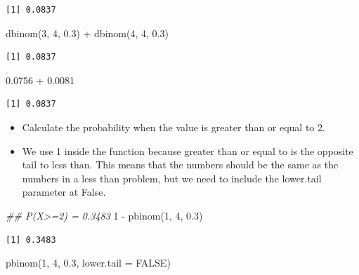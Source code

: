 \documentclass[
  letterpaper,
  DIV=11,
  numbers=noendperiod]{scrreprt}
\newenvironment{Shaded}{\begin{snugshade}}{\end{snugshade}}
\newcommand{\AttributeTok}[1]{\textcolor[rgb]{0.40,0.45,0.13}{#1}}
\newcommand{\ConstantTok}[1]{\textcolor[rgb]{0.56,0.35,0.01}{#1}}
\newcommand{\DecValTok}[1]{\textcolor[rgb]{0.68,0.00,0.00}{#1}}
\newcommand{\DocumentationTok}[1]{\textcolor[rgb]{0.37,0.37,0.37}{\textit{#1}}}
\newcommand{\FloatTok}[1]{\textcolor[rgb]{0.68,0.00,0.00}{#1}}
\newcommand{\FunctionTok}[1]{\textcolor[rgb]{0.28,0.35,0.67}{#1}}
\newcommand{\NormalTok}[1]{\textcolor[rgb]{0.00,0.23,0.31}{#1}}
\newcommand{\SpecialCharTok}[1]{\textcolor[rgb]{0.37,0.37,0.37}{#1}}
\providecommand{\tightlist}{%
  \setlength{\itemsep}{0pt}\setlength{\parskip}{0pt}}\usepackage{longtable,booktabs,array}
\begin{document}
\begin{verbatim}
[1] 0.0837
\end{verbatim}

\begin{Shaded}
\begin{Highlighting}[]
\FunctionTok{dbinom}\NormalTok{(}\DecValTok{3}\NormalTok{, }\DecValTok{4}\NormalTok{, }\FloatTok{0.3}\NormalTok{) }\SpecialCharTok{+} \FunctionTok{dbinom}\NormalTok{(}\DecValTok{4}\NormalTok{, }\DecValTok{4}\NormalTok{, }\FloatTok{0.3}\NormalTok{)}
\end{Highlighting}
\end{Shaded}

\begin{verbatim}
[1] 0.0837
\end{verbatim}

\begin{Shaded}
\begin{Highlighting}[]
\FloatTok{0.0756} \SpecialCharTok{+} \FloatTok{0.0081}
\end{Highlighting}
\end{Shaded}

\begin{verbatim}
[1] 0.0837
\end{verbatim}

\begin{itemize}
\tightlist
\item
  Calculate the probability when the value is greater than or equal to
  2.
\item
  We use 1 inside the function because greater than or equal to is the
  opposite tail to less than. This means that the numbers should be the
  same as the numbers in a less than problem, but we need to include the
  lower.tail parameter at False.
\end{itemize}

\begin{Shaded}
\begin{Highlighting}[]
\DocumentationTok{\#\# P(X\textgreater{}=2) = 0.3483}
\DecValTok{1} \SpecialCharTok{{-}} \FunctionTok{pbinom}\NormalTok{(}\DecValTok{1}\NormalTok{, }\DecValTok{4}\NormalTok{, }\FloatTok{0.3}\NormalTok{)}
\end{Highlighting}
\end{Shaded}

\begin{verbatim}
[1] 0.3483
\end{verbatim}

\begin{Shaded}
\begin{Highlighting}[]
\FunctionTok{pbinom}\NormalTok{(}\DecValTok{1}\NormalTok{, }\DecValTok{4}\NormalTok{, }\FloatTok{0.3}\NormalTok{, }\AttributeTok{lower.tail =} \ConstantTok{FALSE}\NormalTok{)}
\end{Highlighting}
\end{Shaded}
\end{document}
